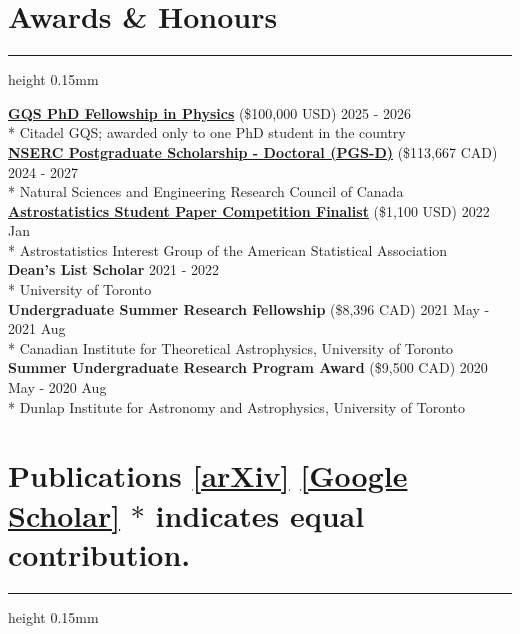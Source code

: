 \documentclass[10pt]{extarticle}
\newcommand{\hrulesp}[1]{%
  \vspace{-3.0mm}
  \hrule height 0.15mm
  \vspace{#1}
}
\newcommand\hide[1]{#1}
\begin{document}
{}
\vspace{-9mm}
\section*{Awards \& Honours}
\hrulesp{2mm}

\href{https://www.citadel.com/careers/students/gqs-phd-fellowship/}{\textbf{GQS PhD Fellowship in Physics}} \hide{(\$100,000 USD)} \hfill 2025 - 2026 \\* 
Citadel GQS; awarded only to one PhD student in the country \\
\href{https://www.nserc-crsng.gc.ca/students-etudiants/pg-cs/bellandpostgrad-belletsuperieures_eng.asp}{\textbf{NSERC Postgraduate Scholarship - Doctoral (PGS-D)}} \hide{(\$113,667 CAD)} \hfill 2024 - 2027 \\*
Natural Sciences and Engineering Research Council of Canada \\
\href{https://astrostat.org/competition/winners.html}{\textbf{Astrostatistics Student Paper Competition Finalist}} \hide{(\$1,100 USD)} \hfill 2022 Jan \\*
Astrostatistics Interest Group of the American Statistical Association \\
\textbf{Dean's List Scholar} \hfill 2021 - 2022 \\*
University of Toronto \\
\textbf{Undergraduate Summer Research Fellowship} \hide{(\$8,396 CAD)} \hfill 2021 May - 2021 Aug \\*
Canadian Institute for Theoretical Astrophysics, University of Toronto \\
\textbf{Summer Undergraduate Research Program Award}  \hide{(\$9,500 CAD)} \hfill 2020 May - 2020 Aug \\*
Dunlap Institute for Astronomy and Astrophysics, University of Toronto 



\vspace{-3mm}
\section*{Publications {\small \href{https://arxiv.org/search/advanced?advanced=&terms-0-operator=AND&terms-0-term=shen\%2Cjeff&terms-0-field=all&classification-computer_science=y&classification-physics=y&classification-physics_archives=astro-ph&classification-statistics=y&classification-include_cross_list=include&date-year=&date-filter_by=date_range&date-from_date=2020&date-to_date=&date-date_type=submitted_date&abstracts=show&size=50&order=-announced_date_first}{[arXiv]} \href{https://scholar.google.com/citations?hl=en&user=1A7poIcAAAAJ}{[Google Scholar]} $\ast$ indicates equal contribution.}}
\hrulesp{3mm}
\end{document}
